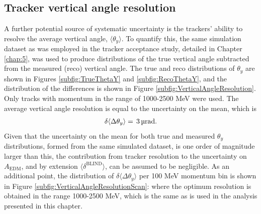 \subsection{Tracker vertical angle resolution}\label{subsec:TrackResolution}

A further potential source of systematic uncertainty is the trackers' ability to resolve the average vertical angle, $\langle \theta_{y} \rangle$. To quantify this, the same simulation dataset as was employed in the tracker acceptance study, detailed in Chapter \ref{chap:5}, was used to produce distributions of the true vertical angle subtracted from the measured (reco) vertical angle. The true and reco distributions of $\theta_{y}$ are shown in Figures \ref{subfig:TrueThetaY} and \ref{subfig:RecoThetaY}, and the distribution of the differences is shown in Figure \ref{subfig:VerticalAngleResolution}. Only tracks with momentum in the range of 1000-2500 MeV were used. The average vertical angle resolution is equal to the uncertainty on the mean, which is
%
\begin{align*}
    \delta \langle \Delta \theta_{y} \rangle = \, \text{\SI{3}{\micro\radian}}. 
\end{align*}
%
Given that the uncertainty on the mean for both true and measured $\theta_{y}$ distributions, formed from the same simulated dataset, is one order of magnitude larger than this, the contribution from tracker resolution to the uncertainty on $A_{\text{EDM}}$, and by extension $\langle \delta^{\text{BLIND}} \rangle$, can be assumed to be negligible. As an additional point, the distribution of $\delta \langle \Delta \theta_{y} \rangle$ per 100 MeV momentum bin is shown in Figure \ref{subfig:VerticalAngleResolutionScan}: where the optimum resolution is obtained in the range 1000-2500 MeV, which is the same as is used in the analysis presented in this chapter.

